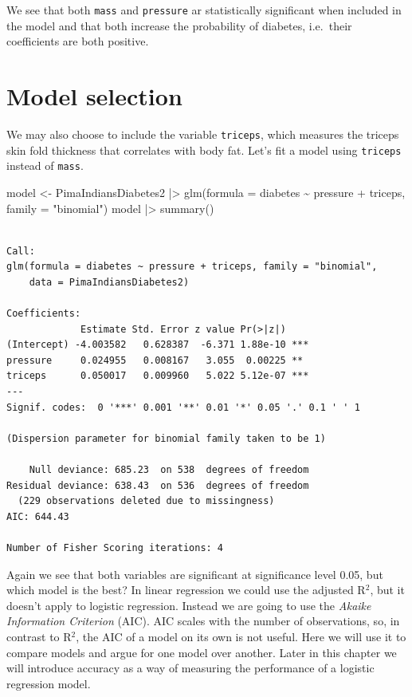 \documentclass[
  letterpaper,
  DIV=11,
  numbers=noendperiod]{scrreprt}
\newenvironment{Shaded}{\begin{snugshade}}{\end{snugshade}}
\newcommand{\AttributeTok}[1]{\textcolor[rgb]{0.40,0.45,0.13}{#1}}
\newcommand{\FunctionTok}[1]{\textcolor[rgb]{0.28,0.35,0.67}{#1}}
\newcommand{\NormalTok}[1]{\textcolor[rgb]{0.00,0.23,0.31}{#1}}
\newcommand{\OtherTok}[1]{\textcolor[rgb]{0.00,0.23,0.31}{#1}}
\newcommand{\SpecialCharTok}[1]{\textcolor[rgb]{0.37,0.37,0.37}{#1}}
\newcommand{\StringTok}[1]{\textcolor[rgb]{0.13,0.47,0.30}{#1}}
\begin{document}
We see that both \texttt{mass} and \texttt{pressure} ar statistically
significant when included in the model and that both increase the
probability of diabetes, i.e.~their coefficients are both positive.

\section{Model selection}\label{model-selection-1}

We may also choose to include the variable \texttt{triceps}, which
measures the triceps skin fold thickness that correlates with body fat.
Let's fit a model using \texttt{triceps} instead of \texttt{mass}.

\begin{Shaded}
\begin{Highlighting}[]
\NormalTok{model }\OtherTok{\textless{}{-}}\NormalTok{ PimaIndiansDiabetes2 }\SpecialCharTok{|\textgreater{}} 
  \FunctionTok{glm}\NormalTok{(}\AttributeTok{formula =}\NormalTok{ diabetes }\SpecialCharTok{\textasciitilde{}}\NormalTok{ pressure }\SpecialCharTok{+}\NormalTok{ triceps, }\AttributeTok{family =} \StringTok{"binomial"}\NormalTok{)}
\NormalTok{model }\SpecialCharTok{|\textgreater{}} \FunctionTok{summary}\NormalTok{()}
\end{Highlighting}
\end{Shaded}

\begin{verbatim}

Call:
glm(formula = diabetes ~ pressure + triceps, family = "binomial", 
    data = PimaIndiansDiabetes2)

Coefficients:
             Estimate Std. Error z value Pr(>|z|)    
(Intercept) -4.003582   0.628387  -6.371 1.88e-10 ***
pressure     0.024955   0.008167   3.055  0.00225 ** 
triceps      0.050017   0.009960   5.022 5.12e-07 ***
---
Signif. codes:  0 '***' 0.001 '**' 0.01 '*' 0.05 '.' 0.1 ' ' 1

(Dispersion parameter for binomial family taken to be 1)

    Null deviance: 685.23  on 538  degrees of freedom
Residual deviance: 638.43  on 536  degrees of freedom
  (229 observations deleted due to missingness)
AIC: 644.43

Number of Fisher Scoring iterations: 4
\end{verbatim}

Again we see that both variables are significant at significance level
0.05, but which model is the best? In linear regression we could use the
adjusted R\(^2\), but it doesn't apply to logistic regression. Instead
we are going to use the \emph{Akaike Information Criterion} (AIC). AIC
scales with the number of observations, so, in contrast to R\(^2\), the
AIC of a model on its own is not useful. Here we will use it to compare
models and argue for one model over another. Later in this chapter we
will introduce accuracy as a way of measuring the performance of a
logistic regression model.
\end{document}
